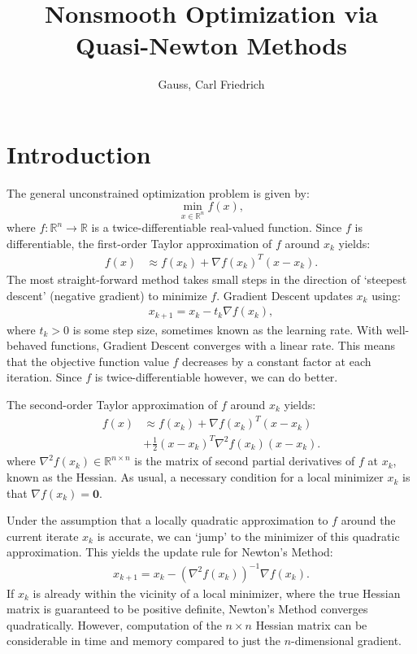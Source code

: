 \documentclass{article}
\title{Nonsmooth Optimization via Quasi-Newton Methods}
\author{Gauss, Carl Friedrich}
\begin{document}
\maketitle

\section{Introduction}

The general unconstrained optimization problem is given by:
\begin{equation}
    \min_{x \in \mathbb{R}^n} f(x),
    \label{eq:unconstrained_optimization_problem}
\end{equation}
where $f: \mathbb{R}^n \to \mathbb{R}$ is a twice-differentiable
real-valued function.
Since $f$ is differentiable,
the first-order Taylor approximation of $f$ around $x_k$ yields:
\begin{align}
    f(x) & \approx f(x_k) + \nabla f(x_k)^T (x - x_k).
\end{align}
The most straight-forward method takes small steps in the direction
of `steepest descent' (negative gradient) to minimize $f$.
Gradient Descent updates $x_k$ using:
\begin{align}
    x_{k+ 1} = x_k - t_k \nabla f(x_k),
    \label{eq:gradient_descent_update_rule}
\end{align}
where $t_k > 0$ is some step size, sometimes known as
the learning rate.
With well-behaved functions, Gradient Descent converges
with a linear rate.
This means that the objective function value $f$ decreases
by a constant factor at each iteration.
Since $f$ is twice-differentiable however, we can do better.

The second-order Taylor approximation of $f$ around $x_k$ yields:
\begin{align}
    f(x) & \approx f(x_k) + \nabla f(x_k)^T (x - x_k)           \\
         & + \frac{1}{2} (x - x_k)^T \nabla^2 f(x_k) (x - x_k).
\end{align}
where $\nabla^2 f(x_k) \in \mathbb{R}^{n \times n}$ is the matrix
of second partial derivatives of $f$ at $x_k$, known as the Hessian.
As usual, a necessary condition for a local minimizer $x_k$ is that
$\nabla f(x_k) = \mathbf{0}$.

Under the assumption that a locally quadratic approximation to $f$
around the current iterate $x_k$ is accurate, we can
`jump' to the minimizer of this quadratic approximation.
This yields the update rule for Newton's Method:
\begin{align}
    x_{k+1} = x_k - (\nabla^2 f(x_k))^{-1} \nabla f(x_k).
    \label{eq:newtons_method_update_rule}
\end{align}
If $x_k$ is already within the vicinity of a local minimizer,
where the true Hessian matrix is guaranteed to be positive definite,
Newton's Method converges quadratically.
However, computation of the $n \times n$ Hessian matrix can be considerable
in time and memory compared to just the $n$-dimensional gradient.
\end{document}
